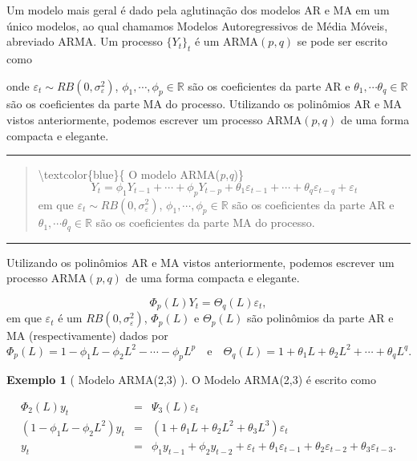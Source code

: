 \documentclass[
]{book}
\theoremstyle{definition}
\theoremstyle{definition}
\newtheorem{example}{Exemplo}[chapter]
\theoremstyle{definition}
\theoremstyle{remark}
\begin{document}
Um modelo mais geral é dado pela aglutinação dos modelos AR e MA em um único modelos, ao qual chamamos Modelos Autoregressivos de Média Móveis, abreviado ARMA. Um processo \(\{Y_t\}_t\) é um ARMA\((p,q)\) se pode ser escrito como

onde \(\varepsilon_t\sim RB(0,\sigma_\varepsilon^2)\), \(\phi_1,\cdots,\phi_p\in\mathbb{R}\) são os coeficientes da parte AR e \(\theta_1,\cdots\theta_q\in\mathbb{R}\) são os coeficientes da parte MA do processo. Utilizando os polinômios AR e MA vistos anteriormente, podemos escrever um processo ARMA\((p,q)\) de uma forma compacta e elegante.

\begin{center}\rule{0.5\linewidth}{0.5pt}\end{center}

\begin{quote}
\textbackslash textcolor\{blue\}\{ O modelo ARMA(\emph{p},\emph{q})\}
\begin{equation}
Y_t=\phi_1Y_{t-1}+\cdots+\phi_pY_{t-p}+\theta_1\varepsilon_{t-1}+\cdots+\theta_q\varepsilon_{t-q} + \varepsilon_t
\label{eq:mARMA2}
\end{equation}
em que \(\varepsilon_t\sim RB(0,\sigma_\varepsilon^2)\), \(\phi_1,\cdots,\phi_p\in\mathbb{R}\) são os coeficientes da parte AR e \(\theta_1,\cdots\theta_q\in\mathbb{R}\) são os coeficientes da parte MA do processo.
\end{quote}

\begin{center}\rule{0.5\linewidth}{0.5pt}\end{center}

Utilizando os polinômios AR e MA vistos anteriormente, podemos escrever um processo ARMA\((p,q)\) de uma forma compacta e elegante.

\[\Phi_p(L)Y_t=\Theta_q(L)\varepsilon_t,\]
em que \(\varepsilon_t\) é um \(RB(0,\sigma_\varepsilon^2)\), \(\Phi_p(L)\) e \(\Theta_p(L)\) são polinômios da parte AR e MA (respectivamente) dados por
\[\Phi_p(L)=1-\phi_1L-\phi_2L^ 2-\cdots-\phi_pL^p  \quad\mbox{e}\quad  \Theta_q(L)=1+ \theta_1L + \theta_2L^2  +\cdots + \theta_qL^q.\]

\begin{example}[ Modelo ARMA(2,3) ]
\protect\hypertarget{exm:arma23}{}{\label{exm:arma23} {} }O Modelo ARMA(2,3) é escrito como

\begin{eqnarray*}
\Phi_2(L)y_t&=&\Psi_3(L)\varepsilon_t\\
(1-\phi_1L-\phi_2L^2)y_t&=&(1+\theta_1L+\theta_2L^2+\theta_3L^3)\varepsilon_t\\
y_t&=&\phi_1y_{t-1}+\phi_2y_{t-2}+\varepsilon_t+\theta_1\varepsilon_{t-1}+\theta_2\varepsilon_{t-2}+\theta_3\varepsilon_{t-3}.
\end{eqnarray*}
\end{example}
\end{document}
